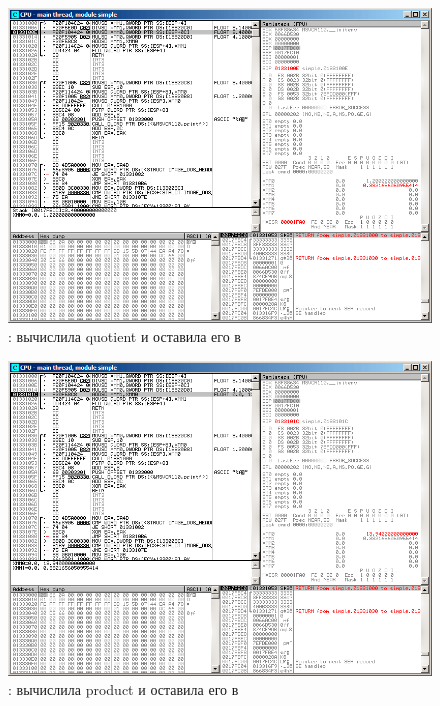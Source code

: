 \clearpage
\begin{figure}[H]
\centering
\includegraphics[scale=\FigScale]{patterns/205_floating_SIMD/simple_olly2.png}
\caption{\olly:  вычислила \gls{quotient} 
и оставила его в }
\label{fig:FPU_SIMD_simple_olly2}
\end{figure}

\clearpage
\begin{figure}[H]
\centering
\includegraphics[scale=\FigScale]{patterns/205_floating_SIMD/simple_olly3.png}
\caption{\olly:  вычислила \gls{product} и оставила его в }
\label{fig:FPU_SIMD_simple_olly3}
\end{figure}

